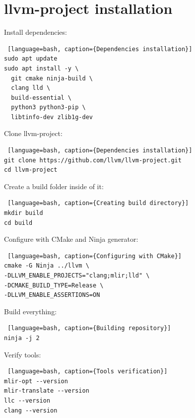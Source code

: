 \documentclass[../main.tex]{subfiles}
\begin{document}
\section{llvm-project installation}

Install dependencies:

\begin{lstlisting} [language=bash, caption={Dependencies installation}]
sudo apt update
sudo apt install -y \
  git cmake ninja-build \
  clang lld \
  build-essential \
  python3 python3-pip \
  libtinfo-dev zlib1g-dev
\end{lstlisting}
Clone llvm-project:
\begin{lstlisting} [language=bash, caption={Dependencies installation}]
git clone https://github.com/llvm/llvm-project.git
cd llvm-project
\end{lstlisting}
Create a build folder inside of it:
\begin{lstlisting} [language=bash, caption={Creating build directory}]
mkdir build
cd build
\end{lstlisting}
Configure with CMake and Ninja generator:
\begin{lstlisting} [language=bash, caption={Configuring with CMake}]
cmake -G Ninja ../llvm \
-DLLVM_ENABLE_PROJECTS="clang;mlir;lld" \
-DCMAKE_BUILD_TYPE=Release \
-DLLVM_ENABLE_ASSERTIONS=ON
\end{lstlisting}
Build everything:
\begin{lstlisting} [language=bash, caption={Building repository}]
ninja -j 2
\end{lstlisting}
Verify tools:
\begin{lstlisting} [language=bash, caption={Tools verification}]
mlir-opt --version
mlir-translate --version
llc --version
clang --version
\end{lstlisting}
\end{document}
